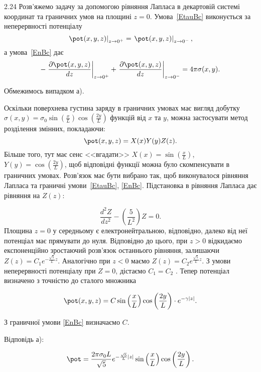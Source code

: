 \begin{Solution}{2.{24}}
    Розв'яжемо задачу за допомогою рівняння Лапласа в декартовій системі координат  та граничних умов на площині $z = 0$. Умова~\eqref{EtauBc} виконується за неперервності потенціалу
	\begin{equation*}\label{continuity}
		\left.\pot(x,y,z)\right|_{z \to 0^+} = \left.\pot(x,y,z)\right|_{z \to 0^-},
	\end{equation*}
	а умова~\eqref{EnBc} дає
	\begin{equation*}\label{boundary}
		-\left. \frac{\partial \pot(x,y,z)}{dz}\right|_{z \to 0^+} + \left. \frac{\partial \pot(x,y,z)}{dz}\right|_{z \to 0^-} =4\pi\sigma(x,y).
	\end{equation*}

	Обмежимось випадком а).

	Оскільки поверхнева густина заряду в граничних умовах має вигляд добутку $\sigma(x, y) = \sigma_0 \sin\left( \frac{x}{L}\right) \cos\left( \frac{2y}{L}\right) $ функцій від $x$ та $y$, можна застосувати метод розділення змінних, покладаючи:
    \[
        \pot(x,y,z) = X(x)Y(y)Z(z).
    \]
Більше того, тут має сенс <<вгадати>> $X(x) = \sin\left(\frac{x}{L}\right) $, $Y(y) =
\cos\left(\frac{2y}{L}\right) $, щоб відповідні функції можна було скомпенсувати в граничних умовах.
Розв'язок має бути вибрано так, щоб виконувалося рівняння Лапласа та граничні умови~\eqref{EtauBc},
\eqref{EnBc}.%
Підстановка в рівняння Лапласа дає рівняння на $Z(z)$:

\begin{equation*}
    \frac{d^2Z}{dz^2} - \left( \frac{5}{L^2}\right) Z = 0.
\end{equation*}
Площина  $z = 0$ у середньому є електронейтральною, відповідно, далеко від неї потенціал має прямувати до нуля. Відповідно до цього, при $z >0$  відкидаємо експоненційно зростаючий розв’язок останнього рівняння, залишаючи $ Z(z) = C_1  e^{-\frac{\sqrt5}{L}z} $. Аналогічно при $z < 0$  маємо $ Z(z) = C_2  e^{\frac{\sqrt5}{L}z} $. З умови неперервності потенціалу при $Z = 0$, дістаємо $C_1 = C_2$ . Тепер потенціал визначено з точністю до сталого множника


	\begin{equation*}
		\pot (x,y,z) = C \sin\left( \frac{x}{L} \right)   \cos\left( \frac{2y}{L} \right)  \cdot e^{-\gamma |z|}.
	\end{equation*}

З граничної умови \eqref{EnBc} визначаємо $C$.

Відповідь а):

	\begin{equation*}
		\pot = \frac{2\pi\sigma_0 L}{\sqrt{5}}e^{-\frac{\sqrt{5}}{L}|z|}\sin\left( \frac{x}{L}\right) \cos\left( \frac{2y}{L}\right) .
	\end{equation*}
\end{Solution}
